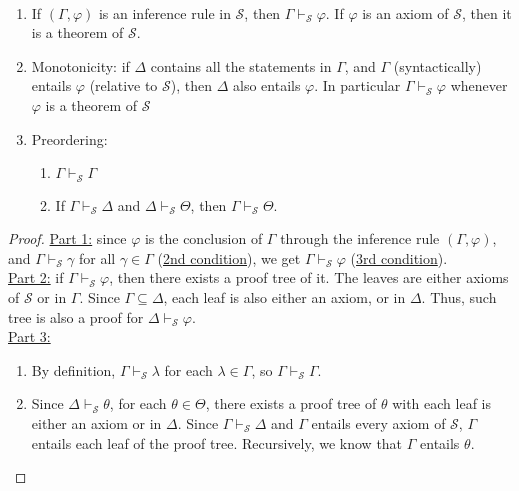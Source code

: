 \documentclass{treatise}
\begin{document}
\begin{shaded}
\begin{remark}
\begin{enumerate}
\end{enumerate}
\end{remark}
\begin{proposition} \label{logic-ent-props} \ 
\begin{enumerate}
    \item If $(\Gamma, \varphi)$ is an inference rule in $\mathcal{S}$, then $\Gamma \vdash_\mathcal{S} \varphi$. If $\varphi$ is an axiom of $\mathcal{S}$, then it is a theorem of $\mathcal{S}$.
    \item Monotonicity: if $\Delta$ contains all the statements in $\Gamma$, and $\Gamma$ (syntactically) entails $\varphi$ (relative to $\mathcal{S}$), then $\Delta$ also entails $\varphi$. In particular $\Gamma \vdash_{\mathcal{S}} \varphi$ whenever $\varphi$ is a theorem of $\mathcal{S}$
    \item Preordering:
    \begin{enumerate}
        \item $\Gamma \vdash_{\mathcal{S}} \Gamma$
        \item If $\Gamma \vdash_\mathcal{S} \Delta$ and $\Delta \vdash_{\mathcal{S}} \Theta$, then $\Gamma \vdash_{\mathcal{S}} \Theta$.
    \end{enumerate}
\end{enumerate}
\end{proposition}
\begin{proof}
\underline{Part 1:} since $\varphi$ is the conclusion of $\Gamma$ through the inference rule $(\Gamma, \varphi)$, and $\Gamma \vdash_{\mathcal{S}} \gamma$ for all $\gamma \in \Gamma$ (\hyperref[logic-ent-hyp]{2nd condition}), we get $\Gamma \vdash_{\mathcal{S}} \varphi$ (\hyperref[logic-ent-rule]{3rd condition}).
\\
\underline{Part 2:} if $\Gamma \vdash_{\mathcal{S}} \varphi$, then there exists a proof tree of it. The leaves are either axioms of $\mathcal{S}$ or in $\Gamma$. Since $\Gamma \subseteq \Delta$, each leaf is also either an axiom, or in $\Delta$. Thus, such tree is also a proof for $\Delta \vdash_{\mathcal{S}} \varphi$.
\\
\underline{Part 3:}
\begin{enumerate}[label = (\alph*)]
    \item By definition, $\Gamma \vdash_{\mathcal{S}} \lambda$ for each $\lambda \in \Gamma$, so $\Gamma \vdash_{\mathcal{S}} \Gamma$.
    \item Since $\Delta \vdash_{\mathcal{S}} \theta$, for each $\theta \in \Theta$, there exists a proof tree of $\theta$ with each leaf is either an axiom or in $\Delta$. Since $\Gamma \vdash_{\mathcal{S}} \Delta$ and $\Gamma$ entails every axiom of $\mathcal{S}$, $\Gamma$ entails each leaf of the proof tree. Recursively, we know that $\Gamma$ entails $\theta$.

\end{enumerate}
\end{proof}
\end{shaded}
\end{document}
